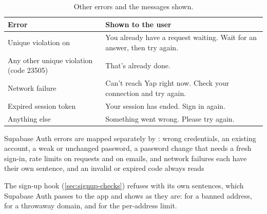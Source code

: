 \begin{table}[ht]
  \centering
  \caption{Other errors and the messages shown.}
  \label{tab:other-errors}
  \tablefont
  \begin{tabularx}{\textwidth}{@{}L{70mm}Y@{}}
    \toprule
    \textsf{\textbf{Error}} & \textsf{\textbf{Shown to the user}} \\
    \midrule
    Unique violation on  & You already have a request waiting. Wait for an answer, then try again. \\
    Any other unique violation (code 23505) & That's already done. \\
    Network failure & Can't reach Yap right now. Check your connection and try again. \\
    Expired session token & Your session has ended. Sign in again. \\
    Anything else & Something went wrong. Please try again. \\
    \bottomrule
  \end{tabularx}
\end{table}

Supabase Auth errors are mapped separately by : wrong credentials, an existing
account, a weak or unchanged password, a password change that needs a fresh sign-in, rate limits on
requests and on emails, and network failures each have their own sentence, and an invalid or expired code
always reads 

The sign-up hook (\cref{sec:signup-checks}) refuses with its own sentences, which Supabase Auth passes to
the app and  shows as they are:  for a banned address,  for a throwaway domain, and  for the per-address limit.
